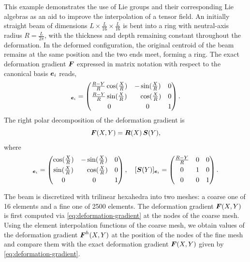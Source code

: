 \documentclass[12pt]{article}
\newcommand{\mbs}[1]{\boldsymbol{#1}}
\def\bS{{\mbs{S}}} \def\bT{{\mbs{T}}} \def\bU{{\mbs{U}}}
\begin{document}
This example demonstrates the use of Lie groups and their
corresponding Lie algebras as an aid to improve the interpolation of a
tensor field. An initially straight beam of dimensions $L \times
\frac{L}{16} \times \frac{L}{16}$ is bent into a ring with
neutral-axis radius $R = \frac{L}{2 \pi}$, with the thickness and
depth remaining constant throughout the deformation. In the deformed
configuration, the original centroid of the beam remains at the same
position and the two ends meet, forming a ring. The exact deformation
gradient $\bF$ expressed in matrix notation with respect to the
canonical basis $\be_i$ reads,
\begin{equation}
  [\bF(X, Y)]_{\be_i} =
  \begin{pmatrix}
    \frac{R-Y}{R} \cos(\frac{X}{R}) & -\sin(\frac{X}{R}) & 0
    \\[0.3em]
    \frac{R-Y}{R} \sin(\frac{X}{R}) & \phantom{-}\cos(\frac{X}{R}) & 0
    \\[0.3em]
    0 & 0 & 1
  \end{pmatrix}.
  \label{eq:deformation-gradient} 
\end{equation}
The right polar decomposition of the deformation gradient is
\begin{equation}
  \bF(X,Y) = \bR(X) \, \bS(Y),
  \label{eq:right-polar}
\end{equation}
where
\begin{equation}
  [\bR(X)]_{\be_i} =
  \begin{pmatrix}
    \cos(\frac{X}{R}) & -\sin(\frac{X}{R}) & 0
    \\[0.3em]
    \sin(\frac{X}{R}) & \phantom{-}\cos(\frac{X}{R})  & 0
    \\[0.3em]
    0 & 0 & 1
  \end{pmatrix},
  \quad
  [\bS(Y)]_{\be_i} =
  \begin{pmatrix}
    \frac{R-Y}{R}  & 0 & 0
    \\[0.3em]
    0 & 1 & 0
    \\[0.3em]
    0 & 0 & 1
  \end{pmatrix}.
  \label{eq:polar-decomposition} 
\end{equation}

The beam is discretized with trilinear hexahedra into two meshes: a
coarse one of 16 elements and a fine one of 2500 elements. The
deformation gradient $\bF(X,Y)$ is first computed via
\eqref{eq:deformation-gradient} at the nodes of the coarse mesh. Using
the element interpolation functions of the coarse mesh, we obtain
values of the deformation gradient $\bF^{h}(X,Y)$ at the position of
the nodes of the fine mesh and compare them with the exact deformation
gradient $\bF(X,Y)$ given by \eqref{eq:deformation-gradient}.
\end{document}
